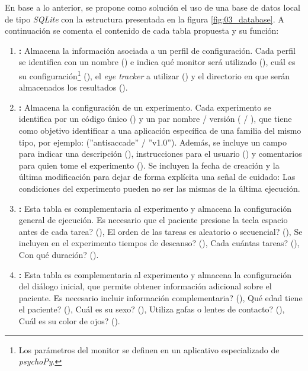 \documentclass[\main/main.tex]{subfiles}
\begin{document}
			En base a lo anterior, se propone como solución el uso de una base de datos local de tipo \textit{SQLite} con la estructura presentada en la figura \ref{fig:03_database}. A continuación se comenta el contenido de cada tabla propuesta y su función:
			\begin{enumerate}\setlength\itemsep{-0.5em}
				\item \textbf{:} Almacena la información asociada a un perfil de configuración. Cada perfil se identifica con un nombre () e indica qué monitor será utilizado (), cuál es su configuración\footnote{Los parámetros del monitor se definen en un aplicativo especializado de \textit{psychoPy}.} (), el \textit{eye tracker} a utilizar () y el directorio en que serán almacenados los resultados ().

				\item \textbf{:} Almacena la configuración de un experimento. Cada experimento se identifica por un código único () y un par nombre / versión ( / ), que tiene como objetivo identificar a una aplicación específica de una familia del mismo tipo, por ejemplo: (''antisaccade'' / ''v1.0''). Además, se incluye un campo para indicar una descripción (), instrucciones para el usuario () y comentarios para quien tome el experimento (). Se incluyen la fecha de creación y la última modificación para dejar de forma explícita una señal de cuidado: Las condiciones del experimento pueden no ser las mismas de la última ejecución.
				
				\item \textbf{:} Esta tabla es complementaria al experimento y almacena la configuración general de ejecución. \textquestiondown Es necesario que el paciente presione la tecla espacio antes de cada tarea? (), \textquestiondown El orden de las tareas es aleatorio o secuencial? (), \textquestiondown Se incluyen en el experimento tiempos de descanso? (), \textquestiondown Cada cuántas tareas? (), \textquestiondown Con qué duración? ().

				\item \textbf{:} Esta tabla es complementaria al experimento y almacena la configuración del diálogo inicial, que permite obtener información adicional sobre el paciente. \textquestiondown Es necesario incluir información complementaria? (), \textquestiondown Qué edad tiene el paciente? (), \textquestiondown Cuál es su sexo? (), \textquestiondown Utiliza gafas o lentes de contacto? (), \textquestiondown Cuál es su color de ojos? ().


\end{enumerate}
\end{document}
